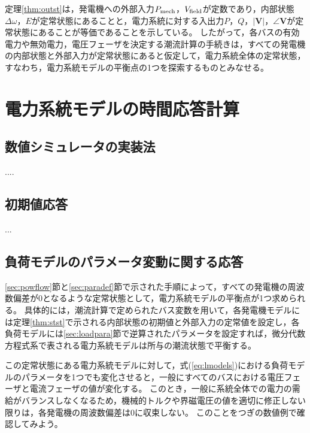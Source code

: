 \documentclass[tombow,dvipdfmx]{corona-a5-1.1}
\begin{document}
定理\ref{thm:outst}は，発電機への外部入力$P_{\rm mech}$，$V_{\rm field}$が定数であり，内部状態$\Delta \omega$，$E$が定常状態にあることと，電力系統に対する入出力$P$，$Q$，$|\bm{V}|$，$\angle \bm{V}$が定常状態にあることが等価であることを示している。
したがって，各バスの有効電力や無効電力，電圧フェーザを決定する潮流計算の手続きは，すべての発電機の内部状態と外部入力が定常状態にあると仮定して，電力系統全体の定常状態，すなわち，電力系統モデルの平衡点の1つを探索するものとみなせる。



\section{電力系統モデルの時間応答計算}

\subsection{数値シミュレータの実装法}
....

\subsection{初期値応答}
...

\subsection{負荷モデルのパラメータ変動に関する応答}\label{sec:resldpara}

\ref{sec:powflow}節と\ref{sec:paradef}節で示された手順によって，すべての発電機の周波数偏差が0となるような定常状態として，電力系統モデルの平衡点が1つ求められる。
具体的には，潮流計算で定められたバス変数を用いて，各発電機モデルには定理\ref{thm:stst}で示される内部状態の初期値と外部入力の定常値を設定し，各負荷モデルには\ref{sec:loadpara}節で逆算されたパラメータを設定すれば，微分代数方程式系で表される電力系統モデルは所与の潮流状態で平衡する。

この定常状態にある電力系統モデルに対して，式(\ref{eq:lmodels})における負荷モデルのパラメータを1つでも変化させると，一般にすべてのバスにおける電圧フェーザと電流フェーザの値が変化する。
このとき，一般に系統全体での電力の需給がバランスしなくなるため，機械的トルクや界磁電圧の値を適切に修正しない限りは，各発電機の周波数偏差は0に収束しない。
このことをつぎの数値例で確認してみよう。

\begin{例}[負荷モデルのパラメータを変化させたときの電力系統モデルの時間応答]\label{ex:loadpv}
\end{例}
\end{document}
